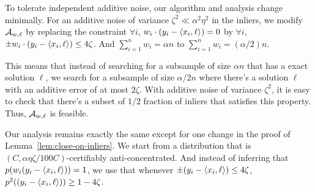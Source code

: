 \begin{remark} \label{remark:tolerating-additive-noise}
To tolerate independent additive noise, our algorithm and analysis change minimally. For an additive noise of variance $\zeta^2 \ll \alpha^2  \eta^2$ in the inliers, we modify $\mathcal A_{w,\ell}$ by replacing the constraint $\forall i$, $w_i \cdot (y_i - \langle x_i,\ell\rangle)= 0$ by $\forall i$, $\pm w_i \cdot (y_i - \langle x_i, \ell\rangle) \leq 4\zeta$. And $\sum_{i = 1}^n w_i = \alpha n$ to $\sum_{i = 1}^n w_i = (\alpha/2) n$. 

This means that instead of searching for a subsample of size $\alpha n$ that has a exact solution $\ell$, we search for a subsample of size $\alpha/2 n$ where there's a solution $\ell$ with an additive error of at most $2\zeta$. With additive noise of variance $\zeta^2$, it is easy to check that there's a subset of $1/2$ fraction of inliers that satisfies this property. Thus, $\mathcal A_{w,\ell}$ is feasible. 

Our analysis remains exactly the same except for one change in the proof of Lemma~\ref{lem:close-on-inliers}. We start from a distribution that is $(C,\alpha \eta \zeta/100C)$-certifiably anti-concentrated. And instead of inferring that $p(w_i(y_i - \langle x_i,\ell\rangle)) = 1$, we use that whenever $\pm (y_i - \langle x_i,\ell\rangle) \leq 4\zeta$, $p^2((y_i - \langle x_i,\ell\rangle)) \geq 1-4\zeta$. 
\end{remark}





 

